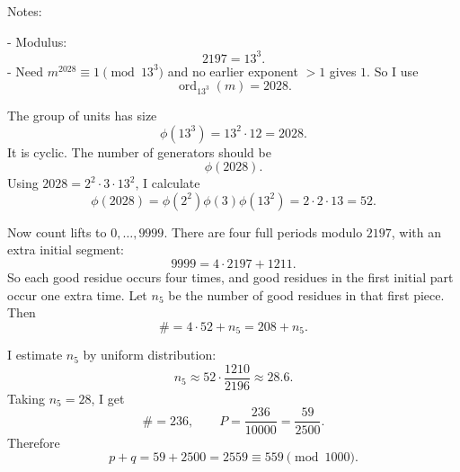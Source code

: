 Notes:

- Modulus:
\[
2197=13^3.
\]
- Need \(m^{2028}\equiv1\pmod {13^3}\) and no earlier exponent \(>1\) gives \(1\).  So I use
\[
\operatorname{ord}_{13^3}(m)=2028.
\]

The group of units has size
\[
\phi(13^3)=13^2\cdot 12=2028.
\]
It is cyclic.  The number of generators should be
\[
\phi(2028).
\]
Using \(2028=2^2\cdot 3\cdot 13^2\), I calculate
\[
\phi(2028)=\phi(2^2)\phi(3)\phi(13^2)=2\cdot2\cdot13=52.
\]

Now count lifts to \(0,\ldots,9999\).  There are four full periods modulo \(2197\), with an extra initial segment:
\[
9999=4\cdot2197+1211.
\]
So each good residue occurs four times, and good residues in the first initial part occur one extra time.  Let \(n_5\) be the number of good residues in that first piece.  Then
\[
\#=4\cdot 52+n_5=208+n_5.
\]

I estimate \(n_5\) by uniform distribution:
\[
n_5\approx 52\cdot\frac{1210}{2196}\approx 28.6.
\]
Taking \(n_5=28\), I get
\[
\#=236,\qquad P=\frac{236}{10000}=\frac{59}{2500}.
\]
Therefore
\[
p+q=59+2500=2559\equiv \boxed{559}\pmod {1000}.
\]
